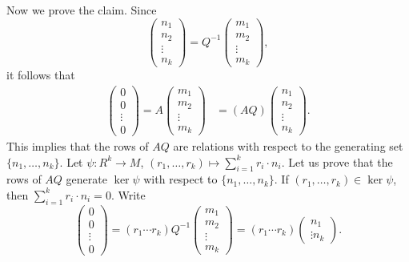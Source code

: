 Now we prove the claim. Since 
\[
\begin{pmatrix}
n_1\\
n_2\\
\vdots\\
n_k	
\end{pmatrix}
=Q^{-1}\begin{pmatrix}
m_1\\
m_2\\
\vdots\\
m_k
\end{pmatrix},
\]
it follows that 
\begin{align*} 
\begin{pmatrix}
0\\
0\\
\vdots\\
0	
\end{pmatrix}
=A\begin{pmatrix}
m_1\\
m_2\\
\vdots\\
m_k	
\end{pmatrix}
&=
(AQ)\begin{pmatrix}
	n_1\\
	n_2\\
	\vdots\\
	n_k
\end{pmatrix}.
\end{align*}
This implies that the rows of $AQ$ are relations with respect to the generating set 
$\{n_1,\dots,n_k\}$. 
Let $\psi\colon R^k\to M$, $(r_1,\dots,r_k)\mapsto \sum_{i=1}^k r_i\cdot n_i$.  
Let us prove that the rows of $AQ$ generate $\ker\psi$ with respect to $\{n_1,\dots,n_k\}$. 
If $(r_1,\dots,r_k)\in \ker\psi$, then 
$\sum_{i=1}^k r_i\cdot n_i=0$. Write 
\[
\begin{pmatrix}
0\\
0\\
\vdots\\
0	
\end{pmatrix}
=(r_1\cdots r_k)Q^{-1}\begin{pmatrix}
m_1\\
m_2\\
\vdots\\
m_k	
\end{pmatrix}
=(r_1\cdots r_k)\begin{pmatrix}
    n_1\\
    \vdots
    n_k
    \end{pmatrix}.
\]
